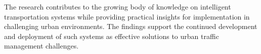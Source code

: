 The research contributes to the growing body of knowledge on intelligent transportation systems while providing practical insights for implementation in challenging urban environments. The findings support the continued development and deployment of such systems as effective solutions to urban traffic management challenges.